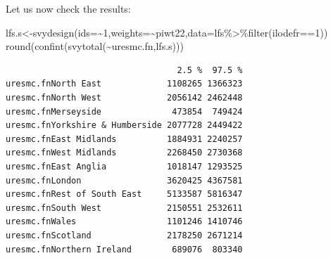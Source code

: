 \documentclass[
  14,
  a4paper,
  DIV=11,
  numbers=noendperiod]{scrartcl}
\newenvironment{Shaded}{\begin{snugshade}}{\end{snugshade}}
\newcommand{\AttributeTok}[1]{\textcolor[rgb]{0.40,0.45,0.13}{#1}}
\newcommand{\DecValTok}[1]{\textcolor[rgb]{0.68,0.00,0.00}{#1}}
\newcommand{\FunctionTok}[1]{\textcolor[rgb]{0.28,0.35,0.67}{#1}}
\newcommand{\NormalTok}[1]{\textcolor[rgb]{0.00,0.23,0.31}{#1}}
\newcommand{\OtherTok}[1]{\textcolor[rgb]{0.00,0.23,0.31}{#1}}
\newcommand{\SpecialCharTok}[1]{\textcolor[rgb]{0.37,0.37,0.37}{#1}}
\begin{document}
\begin{Shaded}
\end{Shaded}

Let us now check the results:

\begin{Shaded}
\begin{Highlighting}[]
\NormalTok{lfs.s}\OtherTok{\textless{}{-}}\FunctionTok{svydesign}\NormalTok{(}\AttributeTok{ids=}\SpecialCharTok{\textasciitilde{}}\DecValTok{1}\NormalTok{,}\AttributeTok{weights=}\SpecialCharTok{\textasciitilde{}}\NormalTok{piwt22,}\AttributeTok{data=}\NormalTok{lfs}\SpecialCharTok{\%\textgreater{}\%}\FunctionTok{filter}\NormalTok{(ilodefr}\SpecialCharTok{==}\DecValTok{1}\NormalTok{)) }
\FunctionTok{round}\NormalTok{(}\FunctionTok{confint}\NormalTok{(}\FunctionTok{svytotal}\NormalTok{(}\SpecialCharTok{\textasciitilde{}}\NormalTok{uresmc.fn,lfs.s)))}
\end{Highlighting}
\end{Shaded}

\begin{verbatim}
                                  2.5 %  97.5 %
uresmc.fnNorth East             1108265 1366323
uresmc.fnNorth West             2056142 2462448
uresmc.fnMerseyside              473854  749424
uresmc.fnYorkshire & Humberside 2077728 2449422
uresmc.fnEast Midlands          1884931 2240257
uresmc.fnWest Midlands          2268450 2730368
uresmc.fnEast Anglia            1018147 1293525
uresmc.fnLondon                 3620425 4367581
uresmc.fnRest of South East     5133587 5816347
uresmc.fnSouth West             2150551 2532611
uresmc.fnWales                  1101246 1410746
uresmc.fnScotland               2178250 2671214
uresmc.fnNorthern Ireland        689076  803340
\end{verbatim}
\end{document}
